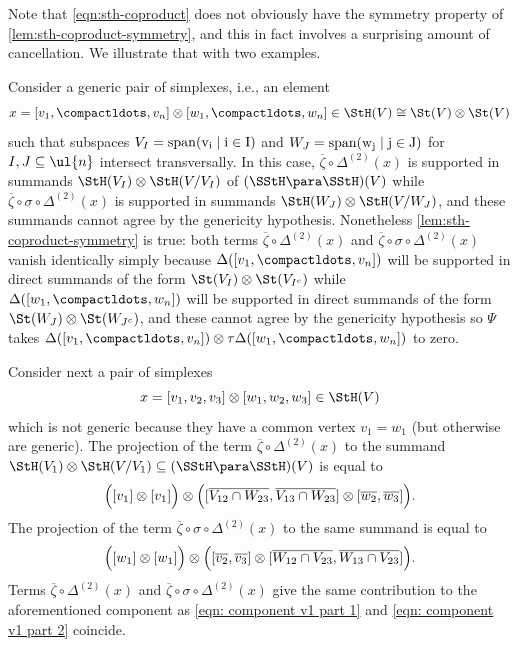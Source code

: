 \documentclass[a4paper]{amsart}
\begin{document}
 Note that \eqref{eqn:sth-coproduct} does not obviously have the symmetry property of \cref{lem:sth-coproduct-symmetry}, and this in fact involves a surprising amount of cancellation. We illustrate that with two examples. 

\begin{example}\label{ex:symmetry-para-decon_1}Consider a generic pair of simplexes, i.e., an element
\[x= [v_1, \compactldots, v_n] \otimes [w_1, \compactldots, w_n] \in \StH(V) \cong \St(V) \otimes \St(V)\]
such that subspaces $V_I = \rm{span}(v_i \mid i \in I)$ and $W_J = \rm{span}(w_j \mid j \in J)$ for $I, J \subseteq \ul{n}$ intersect transversally. In this case, $\overline{\zeta} \circ \Delta^{(2)}(x)$ is supported in summands $\StH(V_I) \otimes \StH(V/V_I)$ of $(\SStH \para \SStH)(V)$ while $\overline{\zeta} \circ \sigma \circ \Delta^{(2)}(x)$ is supported in summands $\StH(W_J) \otimes \StH(V/W_J)$, and these summands cannot agree by the genericity hypothesis. Nonetheless \cref{lem:sth-coproduct-symmetry} is true: both terms $\overline{\zeta} \circ \Delta^{(2)}(x)$ and $\overline{\zeta} \circ \sigma \circ \Delta^{(2)}(x)$ vanish identically simply because $\Delta([v_1,\compactldots,v_n])$ will be supported in direct summands of the form $\St(V_I) \otimes \St(V_{I^c})$ while $\Delta([w_1,\compactldots,w_n])$ will be supported in direct summands of the form $\St(W_J) \otimes \St(W_{J^c})$, and these cannot agree by the genericity hypothesis so $\Psi$ takes $\Delta([v_1,\compactldots,v_n]) \otimes \tau \Delta([w_1,\compactldots,w_n])$ to zero.
\end{example}

\begin{example}\label{ex:symmetry-para-decon_2}
Consider next a pair of simplexes
\[x= [v_1, v_2, v_3] \otimes [w_1, w_2, w_3] \in \StH(V)\]
which is not generic because they have a common vertex $v_1=w_1$ (but otherwise are generic). The projection of the term $\overline{\zeta} \circ \Delta^{(2)}(x)$ to the summand $\StH(V_1)\otimes \StH(V/V_1) \subseteq (\SStH \para \SStH)(V)$ is equal to 
\begin{equation}\label{eqn: component v1 part 1}
\Bigl([v_1]\otimes [v_1]\Bigr) \otimes \Bigl([\overline{V_{12}\cap W_{23}},  \overline{V_{13}\cap W_{23}}]\otimes [\overline{w_2},\overline{w_3}] \Bigr).
\end{equation}
The projection of the term $\overline{\zeta} \circ \sigma \circ \Delta^{(2)}(x)$ to the same summand is equal to 
\begin{equation}\label{eqn: component v1 part 2}
\Bigl([w_1]\otimes [w_1]\Bigr) \otimes \Bigl([\overline{v_2}, \overline{v_3}] \otimes [ \overline{W_{12}\cap V_{23}}, \overline{W_{13}\cap V_{23}}] \Bigr).
\end{equation}
Terms $\overline{\zeta} \circ \Delta^{(2)}(x)$ and $\overline{\zeta} \circ \sigma \circ \Delta^{(2)}(x)$ give the same contribution to the aforementioned component as \eqref{eqn: component v1 part 1} and \eqref{eqn: component v1 part 2} coincide.
\end{example}
\end{document}
